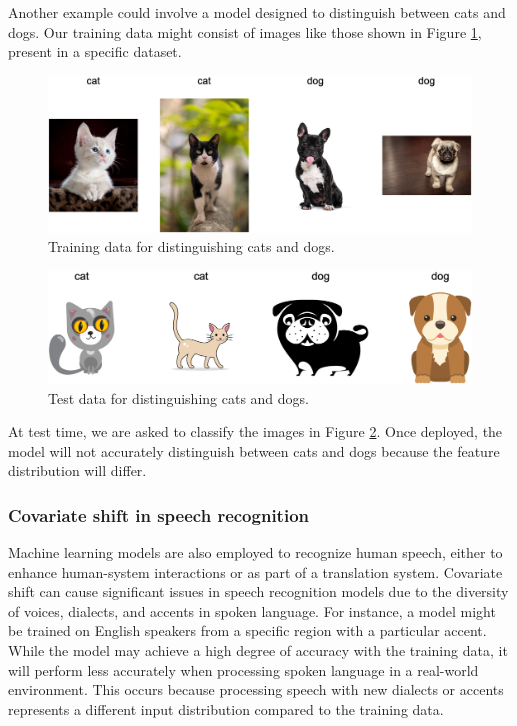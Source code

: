 Another example could involve a model designed to distinguish between cats and dogs. Our training data might consist of images like those shown in Figure \cref{cani-gatti-tr}, present in a specific dataset.

\vspace{0.5cm}
\begin{figure}[h!]
    \centering
    \includegraphics[width=1\textwidth]{../src/assets/cat-dog-train.png} 
    \caption{Training data for distinguishing cats and dogs.}
    \label{cani-gatti-tr}
\end{figure}

\begin{figure}[h!]
    \centering
    \includegraphics[width=1\textwidth]{../src/assets/cat-dog-test.png} 
    \caption{Test data for distinguishing cats and dogs.}
    \label{cani-gatti-ts}
\end{figure}

At test time, we are asked to classify the images in Figure \cref{cani-gatti-ts}. Once deployed, the model will not accurately distinguish between cats and dogs because the feature distribution will differ.


\subsubsection{Covariate shift in speech recognition}
Machine learning models are also employed to recognize human speech, either to enhance human-system interactions or as part of a translation system. Covariate shift can cause significant issues in speech recognition models due to the diversity of voices, dialects, and accents in spoken language. For instance, a model might be trained on English speakers from a specific region with a particular accent. While the model may achieve a high degree of accuracy with the training data, it will perform less accurately when processing spoken language in a real-world environment. This occurs because processing speech with new dialects or accents represents a different input distribution compared to the training data.



